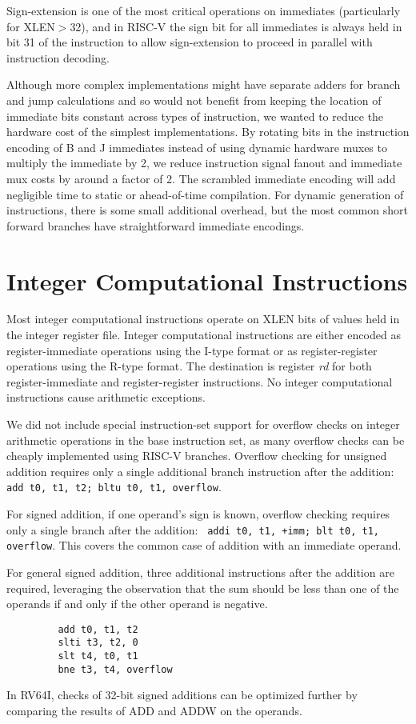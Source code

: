\begin{commentary}
Sign-extension is one of the most critical operations on immediates
(particularly for XLEN$>$32), and in RISC-V the sign bit for all immediates
is always held in bit 31 of the instruction to allow sign-extension to
proceed in parallel with instruction decoding.

Although more complex implementations might have separate adders for
branch and jump calculations and so would not benefit from keeping the
location of immediate bits constant across types of instruction, we
wanted to reduce the hardware cost of the simplest implementations.
By rotating bits in the instruction encoding of B and J immediates
instead of using dynamic hardware muxes to multiply the immediate by
2, we reduce instruction signal fanout and immediate mux costs by
around a factor of 2.  The scrambled immediate encoding will add
negligible time to static or ahead-of-time compilation.  For dynamic
generation of instructions, there is some small additional
overhead, but the most common short forward branches have
straightforward immediate encodings.
\end{commentary}

\section{Integer Computational Instructions}

Most integer computational instructions operate on XLEN bits of values
held in the integer register file.  Integer computational instructions
are either encoded as register-immediate operations using the I-type
format or as register-register operations using the R-type format.
The destination is register {\em rd} for both register-immediate and
register-register instructions.  No integer computational instructions
cause arithmetic exceptions.

\begin{commentary}
We did not include special instruction-set support for overflow checks
on integer arithmetic operations in the base instruction set, as many
overflow checks can be cheaply implemented using RISC-V branches.
Overflow checking for unsigned addition requires only a single
additional branch instruction after the addition:
\verb! add t0, t1, t2; bltu t0, t1, overflow!.

For signed addition, if one operand's sign is known, overflow checking
requires only a single branch after the addition:
\verb! addi t0, t1, +imm; blt t0, t1, overflow!.  This covers the
common case of addition with an immediate operand.

For general signed addition, three additional instructions after the
addition are required, leveraging the observation that the sum should
be less than one of the operands if and only if the other operand is
negative.
\begin{verbatim}
         add t0, t1, t2
         slti t3, t2, 0
         slt t4, t0, t1
         bne t3, t4, overflow
\end{verbatim}
In RV64I, checks of 32-bit signed additions can be optimized further by
comparing the results of ADD and ADDW on the operands.
\end{commentary}

